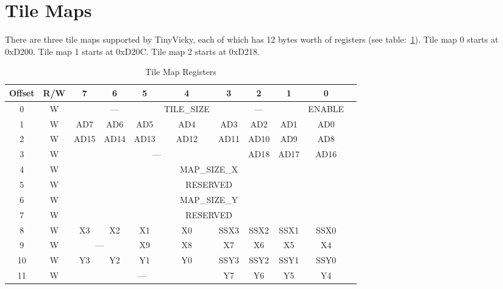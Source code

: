 \section*{Tile Maps}

There are three tile maps supported by TinyVicky, each of which has 12 bytes worth of registers (see table:~\ref{tab:tilemap_reg}). Tile map 0 starts at 0xD200. Tile map 1 starts at 0xD20C. Tile map 2 starts at 0xD218.

\begin{table}[ht]
    \begin{center}
        \begin{tabular}{|c|c|c|c|c|c|c|c|c|c|c|} \hline
            Offset & R/W & 7 & 6 & 5 & 4 & 3 & 2 & 1 & 0 \\ \hline\hline
            0 & W & \multicolumn{3}{|c|}{---} & TILE\_SIZE & \multicolumn{3}{|c|}{---} & ENABLE \\ \hline
            1 & W & AD7 & AD6 & AD5 & AD4 & AD3 & AD2 & AD1 & AD0 \\ \hline
            2 & W & AD15 & AD14 & AD13 & AD12 & AD11 & AD10 & AD9 & AD8 \\ \hline
            3 & W & \multicolumn{5}{|c|}{---} & AD18 & AD17 & AD16 \\ \hline
            4 & W & \multicolumn{8}{|c|}{MAP\_SIZE\_X} \\ \hline
            5 & W & \multicolumn{8}{|c|}{RESERVED} \\ \hline
            6 & W & \multicolumn{8}{|c|}{MAP\_SIZE\_Y} \\ \hline
            7 & W & \multicolumn{8}{|c|}{RESERVED} \\ \hline
            8 & W & X3 & X2 & X1 & X0 & SSX3 & SSX2 & SSX1 & SSX0 \\ \hline
            9 & W & \multicolumn{2}{|c|}{---} & X9 & X8 & X7 & X6 & X5 & X4 \\ \hline
            10 & W & Y3 & Y2 & Y1 & Y0 & SSY3 & SSY2 & SSY1 & SSY0 \\ \hline
            11 & W & \multicolumn{4}{|c|}{---} & Y7 & Y6 & Y5 & Y4 \\ \hline
        \end{tabular}
    \end{center}
    \caption{Tile Map Registers}
    \label{tab:tilemap_reg}
\end{table}

